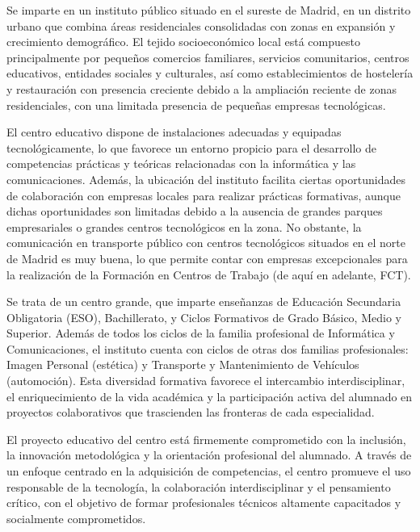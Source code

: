 Se imparte en un instituto público situado en el sureste de Madrid, en un distrito urbano que combina áreas residenciales consolidadas con zonas en expansión y crecimiento demográfico. El tejido socioeconómico local está compuesto principalmente por pequeños comercios familiares, servicios comunitarios, centros educativos, entidades sociales y culturales, así como establecimientos de hostelería y restauración con presencia creciente debido a la ampliación reciente de zonas residenciales, con una limitada presencia de pequeñas empresas tecnológicas.

El centro educativo dispone de instalaciones adecuadas y equipadas tecnológicamente, lo que favorece un entorno propicio para el desarrollo de competencias prácticas y teóricas relacionadas con la informática y las comunicaciones. Además, la ubicación del instituto facilita ciertas oportunidades de colaboración con empresas locales para realizar prácticas formativas, aunque dichas oportunidades son limitadas debido a la ausencia de grandes parques empresariales o grandes centros tecnológicos en la zona. No obstante, la comunicación en transporte público con centros tecnológicos situados en el norte de Madrid es muy buena, lo que permite contar con empresas excepcionales para la realización de la Formación en Centros de Trabajo (de aquí en adelante, FCT).

Se trata de un centro grande, que imparte enseñanzas de Educación Secundaria Obligatoria (ESO), Bachillerato, y Ciclos Formativos de Grado Básico, Medio y Superior. Además de todos los ciclos de la familia profesional de Informática y Comunicaciones, el instituto cuenta con ciclos de otras dos familias profesionales: Imagen Personal (estética) y Transporte y Mantenimiento de Vehículos (automoción). Esta diversidad formativa favorece el intercambio interdisciplinar, el enriquecimiento de la vida académica y la participación activa del alumnado en proyectos colaborativos que trascienden las fronteras de cada especialidad.

El proyecto educativo del centro está firmemente comprometido con la inclusión, la innovación metodológica y la orientación profesional del alumnado. A través de un enfoque centrado en la adquisición de competencias, el centro promueve el uso responsable de la tecnología, la colaboración interdisciplinar y el pensamiento crítico, con el objetivo de formar profesionales técnicos altamente capacitados y socialmente comprometidos.


